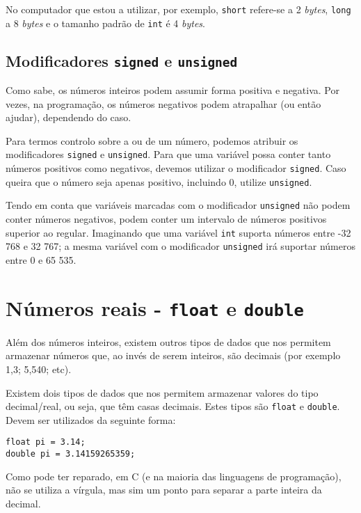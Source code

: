 No computador que estou a utilizar, por exemplo, \texttt{short} refere-se a 2 \textit{bytes}, \texttt{long} a 8 \textit{bytes} e o tamanho padrão de \texttt{int} é 4 \textit{bytes}.

\subsection{Modificadores \texttt{signed} e \texttt{unsigned}}

Como sabe, os números inteiros podem assumir forma positiva e negativa. Por vezes, na programação, os números negativos podem atrapalhar (ou então ajudar), dependendo do caso.

Para termos controlo sobre a  ou  de um número, podemos atribuir os modificadores \texttt{signed} e \texttt{unsigned}. Para que uma variável possa conter tanto números positivos como negativos, devemos utilizar o modificador \texttt{signed}. Caso queira que o número seja apenas positivo, incluindo 0, utilize \texttt{unsigned}.

Tendo em conta que variáveis marcadas com o modificador \texttt{unsigned} não podem conter números negativos, podem conter um intervalo de números positivos superior ao regular. Imaginando que uma variável \texttt{int} suporta números entre -32 768 e 32 767; a mesma variável com o modificador \texttt{unsigned} irá suportar números entre 0 e 65 535.

\section{Números reais - \texttt{float} e \texttt{double}}

Além dos números inteiros, existem outros tipos de dados que nos permitem armazenar números que, ao invés de serem inteiros, são decimais (por exemplo 1,3; 5,540; etc).

Existem dois tipos de dados que nos permitem armazenar valores do tipo decimal/real, ou seja, que têm casas decimais. Estes tipos são \texttt{float} e \texttt{double}. Devem ser utilizados da seguinte forma:

\begin{lstlisting}
float pi = 3.14;
double pi = 3.14159265359;
\end{lstlisting}

Como pode ter reparado, em C (e na maioria das linguagens de programação), não se utiliza a vírgula, mas sim um ponto para separar a parte inteira da decimal.

